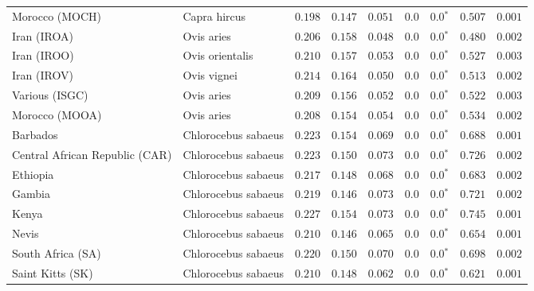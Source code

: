 \begin{center}
\begin{adjustbox}{width = 1\textwidth}
\begin{tabular}{|l|l|r|r|r|r|r|r|r|}
            Morocco (MOCH)                    & Capra hircus     & $ 0.198$ & $ 0.147$ & $ 0.051$ & $0.0$ & $\bm{0.0{^*}}$ & $ 0.507$ & $ 0.001$ \\
            Iran (IROA)                    & Ovis aries         & $ 0.206$ & $ 0.158$ & $ 0.048$ & $0.0$ & $\bm{0.0{^*}}$ & $ 0.480$ & $ 0.002$ \\
            Iran (IROO)                 & Ovis orientalis          & $ 0.210$ & $ 0.157$ & $ 0.053$ & $0.0$ & $\bm{0.0{^*}}$ & $ 0.527$ & $ 0.003$ \\
            Iran (IROV)                 & Ovis vignei          & $ 0.214$ & $ 0.164$ & $ 0.050$ & $0.0$ & $\bm{0.0{^*}}$ & $ 0.513$ & $ 0.002$ \\
            Various (ISGC)                       & Ovis aries & $ 0.209$ & $ 0.156$ & $ 0.052$ & $0.0$ & $\bm{0.0{^*}}$ & $ 0.522$ & $ 0.003$ \\
            Morocco (MOOA) & Ovis aries & $ 0.208$ & $ 0.154$ & $ 0.054$ & $0.0$ & $\bm{0.0{^*}}$ & $ 0.534$ & $ 0.002$ \\
            Barbados                       & Chlorocebus sabaeus & $ 0.223$ & $ 0.154$ & $ 0.069$ & $0.0$ & $\bm{0.0{^*}}$ & $ 0.688$ & $ 0.001$ \\
            Central African Republic (CAR)                         & Chlorocebus sabaeus & $ 0.223$ & $ 0.150$ & $ 0.073$ & $0.0$ & $\bm{0.0{^*}}$ & $ 0.726$ & $ 0.002$ \\
            Ethiopia                          & Chlorocebus sabaeus & $ 0.217$ & $ 0.148$ & $ 0.068$ & $0.0$ & $\bm{0.0{^*}}$ & $ 0.683$ & $ 0.002$ \\
            Gambia                          & Chlorocebus sabaeus & $ 0.219$ & $ 0.146$ & $ 0.073$ & $0.0$ & $\bm{0.0{^*}}$ & $ 0.721$ & $ 0.002$ \\
            Kenya              & Chlorocebus sabaeus & $ 0.227$ & $ 0.154$ & $ 0.073$ & $0.0$ & $\bm{0.0{^*}}$ & $ 0.745$ & $ 0.001$ \\
            Nevis               & Chlorocebus sabaeus & $ 0.210$ & $ 0.146$ & $ 0.065$ & $0.0$ & $\bm{0.0{^*}}$ & $ 0.654$ & $ 0.001$ \\
            South Africa (SA)                         & Chlorocebus sabaeus & $ 0.220$ & $ 0.150$ & $ 0.070$ & $0.0$ & $\bm{0.0{^*}}$ & $ 0.698$ & $ 0.002$ \\
            Saint Kitts (SK)                  & Chlorocebus sabaeus        & $ 0.210$ & $ 0.148$ & $ 0.062$ & $0.0$ & $\bm{0.0{^*}}$ & $ 0.621$ & $ 0.001$ \\

\end{tabular}
\end{adjustbox}
\end{center}
